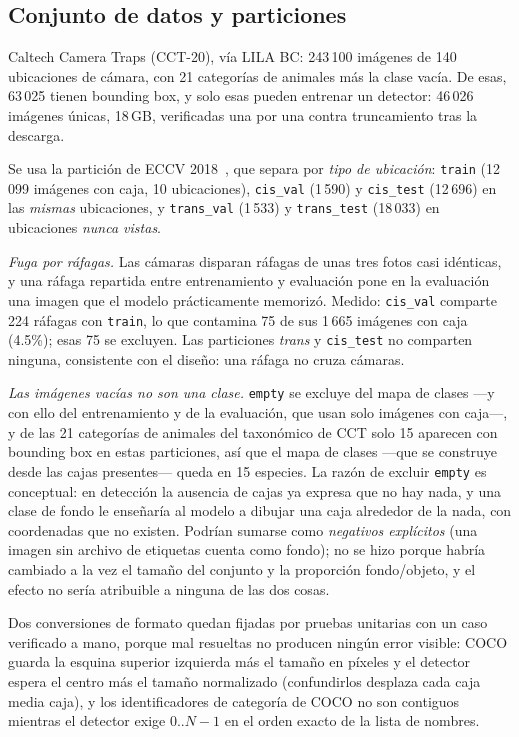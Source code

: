 \subsection{Conjunto de datos y particiones}

Caltech Camera Traps (CCT-20), vía LILA BC: 243\,100 imágenes de 140 ubicaciones
de cámara, con 21 categorías de animales más la clase vacía. De esas, 63\,025
tienen bounding box, y solo esas pueden entrenar un detector: 46\,026 imágenes
únicas, 18\,GB, verificadas una por una contra truncamiento tras la descarga.

Se usa la partición de ECCV 2018~\cite{beery2018recognition}, que separa por
\emph{tipo de ubicación}: \texttt{train} (12\,099 imágenes con caja, 10
ubicaciones), \texttt{cis\_val} (1\,590) y \texttt{cis\_test} (12\,696) en las
\emph{mismas} ubicaciones, y \texttt{trans\_val} (1\,533) y \texttt{trans\_test}
(18\,033) en ubicaciones \emph{nunca vistas}.

\emph{Fuga por ráfagas.} Las cámaras disparan ráfagas de unas tres fotos casi
idénticas, y una ráfaga repartida entre entrenamiento y evaluación pone en la
evaluación una imagen que el modelo prácticamente memorizó. Medido:
\texttt{cis\_val} comparte 224 ráfagas con \texttt{train}, lo que contamina 75 de
sus 1\,665 imágenes con caja (4.5\%); esas 75 se excluyen. Las particiones
\emph{trans} y \texttt{cis\_test} no comparten ninguna, consistente con el
diseño: una ráfaga no cruza cámaras.

\emph{Las imágenes vacías no son una clase.} \texttt{empty} se excluye del mapa
de clases —y con ello del entrenamiento y de la evaluación, que usan solo
imágenes con caja—, y de las 21 categorías de animales del taxonómico de CCT solo
15 aparecen con bounding box en estas particiones, así que el mapa de clases —que
se construye desde las cajas presentes— queda en 15 especies. La razón de excluir
\texttt{empty} es conceptual: en detección
la ausencia de cajas ya expresa que no hay nada, y una clase de fondo le
enseñaría al modelo a dibujar una caja alrededor de la nada, con coordenadas que
no existen. Podrían sumarse como \emph{negativos explícitos} (una imagen sin
archivo de etiquetas cuenta como fondo); no se hizo porque habría cambiado a la
vez el tamaño del conjunto y la proporción fondo/objeto, y el efecto no sería
atribuible a ninguna de las dos cosas.

Dos conversiones de formato quedan fijadas por pruebas unitarias con un caso
verificado a mano, porque mal resueltas no producen ningún error visible: COCO
guarda la esquina superior izquierda más el tamaño en píxeles y el detector
espera el centro más el tamaño normalizado (confundirlos desplaza cada caja media
caja), y los identificadores de categoría de COCO no son contiguos mientras el
detector exige $0..N{-}1$ en el orden exacto de la lista de nombres.

